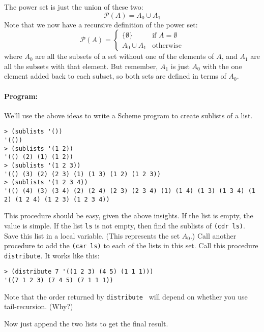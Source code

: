 \documentclass{article}
\newcommand{\set}[1]{\ensuremath{\{#1\}}}
\newcommand{\power}[1]{\ensuremath{\mathcal{P}(#1)}}
\begin{document}
The power set is just the union of these two:
\[
\power{A} = A_0 \cup A_1
\]
Note that we now have a recursive definition of the power set:
\[
\power{A} = \left\{\begin{array}{ll}
\set{\emptyset} & \mbox{if $A=\emptyset$}\\
A_0 \cup A_1 & \mbox{otherwise}
\end{array}\right.
\]
where $A_0$ are all the subsets of a set without one of the elements
of $A$, and $A_1$ are all the subsets with that element.  But remember,
$A_1$ is just $A_0$ with the one element added back to each subset,
so both sets
are defined in terms of $A_0$.

\paragraph{Program:} We'll use the above ideas to write a Scheme
program to create sublists of a list.
{\small
\begin{Verbatim}[frame=single]
> (sublists '())
'(())
> (sublists '(1 2))
'(() (2) (1) (1 2))
> (sublists '(1 2 3))
'(() (3) (2) (2 3) (1) (1 3) (1 2) (1 2 3))
> (sublists '(1 2 3 4))
'(() (4) (3) (3 4) (2) (2 4) (2 3) (2 3 4) (1) (1 4) (1 3) (1 3 4) (1 2) (1 2 4) (1 2 3) (1 2 3 4))
\end{Verbatim}
}
This procedure should be easy, given the above insights.  If the list
is empty, the value is simple.  If the list {\tt ls} is not empty,
then find the sublists of {\tt (cdr ls)}.  Save this list in a local
variable.  (This represents the set $A_0$.) Call another procedure to
add the {\tt (car ls)} to each of the lists in this set.  Call this
procedure {\tt distribute}.  It works like this:
\begin{Verbatim}[frame=single]
> (distribute 7 '((1 2 3) (4 5) (1 1 1)))
'((7 1 2 3) (7 4 5) (7 1 1 1))
\end{Verbatim}
Note that the order returned by {\tt distribute } will depend on
whether you use tail-recursion.  (Why?)

Now just append the two lists to get the final result.
\end{document}
